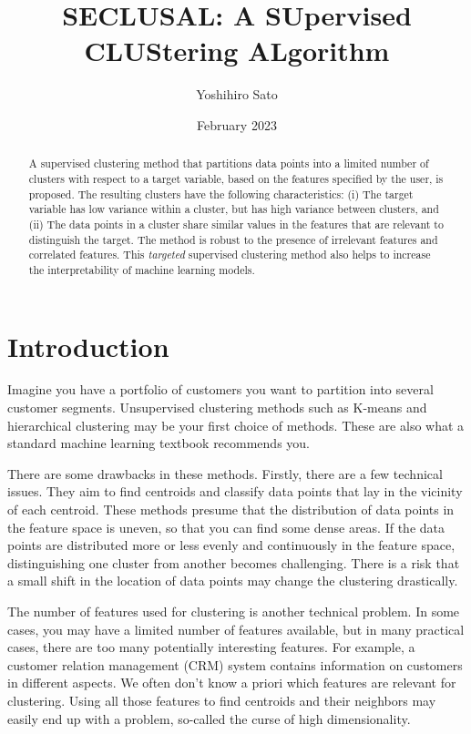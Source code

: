 \documentclass{article}
\title{SECLUSAL: A SUpervised CLUStering ALgorithm}
\author{Yoshihiro Sato}
\date{February 2023}
\begin{document}
\begin{abstract}
A supervised clustering method that partitions data points into a limited number of clusters with respect to a target variable, based on the features specified by the user, is proposed.
The resulting clusters have the following characteristics: 
(i) The target variable has low variance within a cluster, but has high variance between clusters, and (ii) The data points in a cluster share similar values in the features that are relevant to distinguish the target. 
The method is robust to %
the presence of irrelevant features and correlated features. 
This {\em targeted}  supervised clustering method also helps to increase the interpretability of machine learning models.
\end{abstract}

\maketitle

\section{Introduction}

Imagine you have a portfolio of customers you want to partition into several customer segments. Unsupervised clustering methods such as K-means and hierarchical clustering may be your first choice of methods. These are also what a standard machine learning textbook recommends you. 

There are some drawbacks in these methods. Firstly, there are a few technical issues. They aim to find centroids and classify data points that lay in the vicinity of each centroid. These methods presume that the distribution of data points in the feature space is uneven, so that you can find some dense areas. If the data points are distributed more or less evenly and continuously in the feature space, distinguishing one cluster from another becomes challenging. There is a risk that a small shift in the location of data points may change the clustering drastically.

The number of features used for clustering is another technical problem. In some cases, you may have a limited number of features available, but in many practical cases, there are too many potentially interesting features. For example, a customer relation management (CRM) system contains information on customers in different aspects. We often don’t know a priori which features are relevant for clustering. Using all those features to find centroids and their neighbors may easily end up with a problem, so-called the curse of high dimensionality. 
\end{document}
